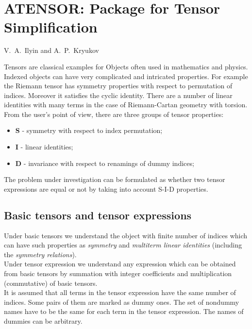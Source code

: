 \documentclass[11pt,letterpaper]{book}
\makeatletter
\newcommand{\underscore}{\_}
\newcommand{\ttindex}[1]{{\renewcommand{\_}{\protect\underscore}%
                          \index{#1@{\tt #1}}}}
\makeatother
\begin{document}
\chapter[ATENSOR: Tensor Simplification]%
{ATENSOR: Package for Tensor Simplification}
\label{ATENSOR}

{\footnotesize
\begin{center}
V.~A.~Ilyin and A.~P.~Kryukov \\
\end{center}
}
\ttindex{ATENSOR}


Tensors are classical examples for Objects often used in mathematics and physics.
Indexed objects can have very complicated and intricated properties.
For example the Riemann tensor has symmetry properties with respect to
permutation of indices. Moreover it satisfies the cyclic identity. There are a
number of linear identities with many terms in the case of Riemann-Cartan geometry
with torsion.
From the user's point of view, there are three groups of tensor properties:
\begin{itemize}
\item {\bf S} - symmetry with respect to index permutation;
\item {\bf I} - linear identities;
\item {\bf D} - invariance with respect to renamings of dummy indices;
\end{itemize}
The problem under investigation can be formulated as whether two tensor
expressions are equal or not by taking into account S-I-D properties.

\section{Basic tensors and tensor expressions}
Under basic tensors we understand the object with finite number of indices
which can have such properties as {\it symmetry} and {\it multiterm linear identities}
(including the {\it symmetry relations}). \\
Under tensor expression we understand any expression which can be obtained
from basic tensors by summation with integer coefficients and multiplication
(commutative) of basic tensors. \\
It is assumed that all terms in the tensor expression have the same number of
indices. Some pairs of them are marked as dummy ones. The set of nondummy
names have to be the same for each term in the tensor expression. The names
of dummies can be arbitrary.
\end{document}
